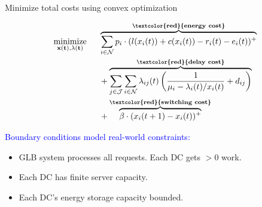 \documentclass[xcolor=dvipsnames]{beamer}
\begin{document}
\begin{frame}{Minimize total costs using convex optimization}

\begin{align*}
&\underset{\bf{x}(t), \bf{\lambda}(t)}{\text{minimize}} & \hspace{0.5em}
	& \overbrace{ \sum_{i \in \mathcal{N}} p_i \cdot (l(x_i(t)) + c(x_i(t)) - r_i(t) - e_i(t))^+ }^{\text{\textbf{\textcolor{red}{energy cost}}}} \\
	&&& {} + \overbrace{ \sum_{j \in \mathcal{J}}\sum_{i \in \mathcal{N}} \lambda_{ij}(t)\left(\frac{1}{\mu_i - \lambda_i(t)/x_i(t)} + d_{ij}\right) }^{\text{\textbf{\textcolor{red}{delay cost}}}}  \\
	&&& {} + \overbrace{ \beta \cdot (x_i(t+1) - x_i(t))^+ }^{\text{\textbf{\textcolor{red}{switching cost}}}}
\end{align*}
\vspace{-2mm}


	\begin{block}{\textcolor{blue}{Boundary conditions model real-world constraints:}}
	\begin{itemize}
	\item
	GLB system processes all requests. Each DC gets $>0$ work.
	\item
	Each DC has finite server capacity. %
	\item
	Each DC's energy storage capacity bounded.
	\end{itemize}
	\end{block}
\end{frame}
\end{document}
